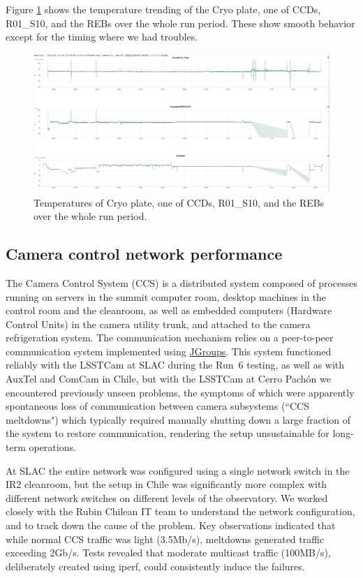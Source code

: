 Figure \ref{fig:tempsoverthewholeperiod} shows the temperature trending of the Cryo plate, one of CCDs, R01\_S10, and the REBs over the whole run period. These show smooth behavior except for the timing where we had troubles.
\begin{figure}
    \centering
    \includegraphics[width=1.0\linewidth]{figures/Issues/LSSTCam_Temps_Run7.png}
    \caption{Temperatures of Cryo plate, one of CCDs, R01\_S10, and the REBs over the whole run period.}
    \label{fig:tempsoverthewholeperiod}
\end{figure}

\clearpage
\subsection{Camera control network performance}\label{sec:ccsmeltdown}

The Camera Control System (CCS) is a distributed system composed of processes running on servers in the summit computer room, desktop machines in the control room and the cleanroom, as well as embedded computers (Hardware Control Units) in the camera utility trunk, and attached to the camera refrigeration system. The communication mechanism relies on a peer-to-peer communication system implemented using \href{http://jgroups.org/}{JGroups}. This system functioned reliably with the LSSTCam at SLAC during the Run~6 testing, as well as with AuxTel and ComCam in Chile, but with the LSSTCam at Cerro Pachón we encountered previously unseen problems, the symptoms of which were apparently spontaneous loss of communication between camera subsystems (``CCS meltdowns") which typically required manually shutting down a large fraction of the system to restore communication, rendering the setup unsustainable for long-term operations.

At SLAC the entire network was configured using a single network switch in the IR2 cleanroom, but the setup in Chile was significantly more complex with different network switches on different levels of the observatory. We worked closely with the Rubin Chilean IT team to understand the network configuration, and to track down the cause of the problem. Key observations indicated that while normal CCS traffic was light (3.5Mb/s), meltdowns generated traffic exceeding 2Gb/s. Tests revealed that moderate multicast traffic (100MB/s), deliberately created using iperf, could consistently induce the failures. 

